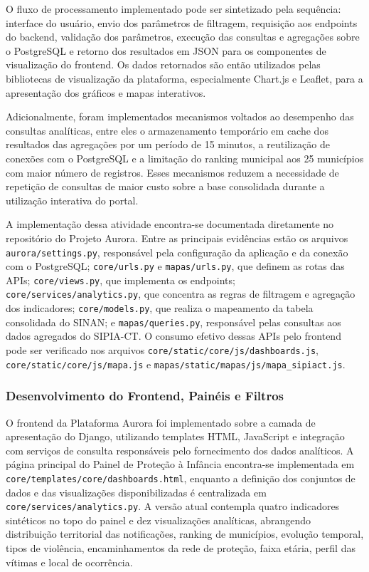 \documentclass[11pt,a4paper]{article}
\begin{document}
O fluxo de processamento implementado pode ser sintetizado pela sequência:
interface do usuário, envio dos parâmetros de filtragem, requisição aos
endpoints do backend, validação dos parâmetros, execução das consultas e
agregações sobre o PostgreSQL e retorno dos resultados em JSON para os
componentes de visualização do frontend. Os dados retornados são então
utilizados pelas bibliotecas de visualização da plataforma, especialmente
Chart.js e Leaflet, para a apresentação dos gráficos e mapas interativos.

Adicionalmente, foram implementados mecanismos voltados ao desempenho das
consultas analíticas, entre eles o armazenamento temporário em cache dos
resultados das agregações por um período de 15 minutos, a reutilização de
conexões com o PostgreSQL e a limitação do ranking municipal aos 25
municípios com maior número de registros. Esses mecanismos reduzem a
necessidade de repetição de consultas de maior custo sobre a base consolidada
durante a utilização interativa do portal.

A implementação dessa atividade encontra-se documentada diretamente no
repositório do Projeto Aurora. Entre as principais evidências estão os
arquivos \texttt{aurora/settings.py}, responsável pela configuração da
aplicação e da conexão com o PostgreSQL; \texttt{core/urls.py} e
\texttt{mapas/urls.py}, que definem as rotas das APIs;
\texttt{core/views.py}, que implementa os endpoints;
\texttt{core/services/analytics.py}, que concentra as regras de filtragem e
agregação dos indicadores; \texttt{core/models.py}, que realiza o mapeamento
da tabela consolidada do SINAN; e \texttt{mapas/queries.py}, responsável
pelas consultas aos dados agregados do SIPIA-CT. O consumo efetivo dessas
APIs pelo frontend pode ser verificado nos arquivos
\texttt{core/static/core/js/dashboards.js},
\texttt{core/static/core/js/mapa.js} e
\texttt{mapas/static/mapas/js/mapa\_sipiact.js}.

\subsubsection{Desenvolvimento do Frontend, Painéis e Filtros}
\label{subsubsec:frontend_paineis_filtros_meta3}

O frontend da Plataforma Aurora foi implementado sobre a camada de apresentação do Django, utilizando templates HTML, JavaScript e integração com serviços de consulta responsáveis pelo fornecimento dos dados analíticos. A página principal do Painel de Proteção à Infância encontra-se implementada em \texttt{core/templates/core/dashboards.html}, enquanto a definição dos conjuntos de dados e das visualizações disponibilizadas é centralizada em \texttt{core/services/analytics.py}. A versão atual contempla quatro indicadores sintéticos no topo do painel e dez visualizações analíticas, abrangendo distribuição territorial das notificações, ranking de municípios, evolução temporal, tipos de violência, encaminhamentos da rede de proteção, faixa etária, perfil das vítimas e local de ocorrência.
\end{document}
